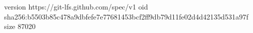 version https://git-lfs.github.com/spec/v1
oid sha256:b5503b85c478a9dbfefe7e77681453bcf2ff9db79d11fe02d4d42135d531a97f
size 87020
